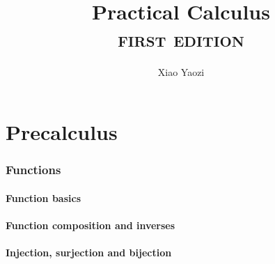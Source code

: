 \documentclass[10pt]{article}
\title{{\Huge Practical Calculus} \\ {\Large \scshape first edition}}
\author{Xiao Yaozi}
\begin{document}
  \maketitle
  \flushbottom
  \newpage
  \pagestyle{fancynotes}
  \part{Precalculus}
  \section{Functions}
  \subsection{Function basics}
  
  \newpage
  \subsection{Function composition and inverses}
  
  \newpage
  \subsection{Injection, surjection and bijection}
  
  \newpage
 
\end{document}

